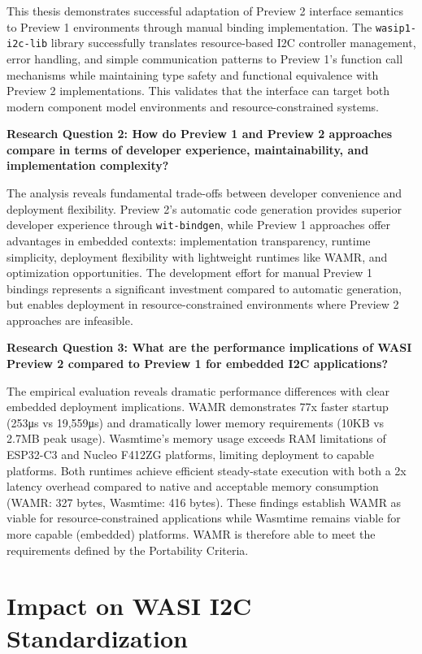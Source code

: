 This thesis demonstrates successful adaptation of Preview 2 interface semantics to Preview 1 environments through manual binding implementation. The \texttt{wasip1-i2c-lib} library successfully translates resource-based I2C controller management, error handling, and simple communication patterns to Preview 1's function call mechanisms while maintaining type safety and functional equivalence with Preview 2 implementations. This validates that the interface can target both modern component model environments and resource-constrained systems.

\textbf{Research Question 2: How do Preview 1 and Preview 2 approaches compare in terms of developer experience, maintainability, and implementation complexity?}

The analysis reveals fundamental trade-offs between developer convenience and deployment flexibility. Preview 2's automatic code generation provides superior developer experience through \texttt{wit-bindgen}, while Preview 1 approaches offer advantages in embedded contexts: implementation transparency, runtime simplicity, deployment flexibility with lightweight runtimes like WAMR, and optimization opportunities. The development effort for manual Preview 1 bindings represents a significant investment compared to automatic generation, but enables deployment in resource-constrained environments where Preview 2 approaches are infeasible.

\textbf{Research Question 3: What are the performance implications of WASI Preview 2 compared to Preview 1 for embedded I2C applications?}

The empirical evaluation reveals dramatic performance differences with clear embedded deployment implications. WAMR demonstrates 77x faster startup (253μs vs 19,559μs) and dramatically lower memory requirements (10KB vs 2.7MB peak usage). Wasmtime's memory usage exceeds RAM limitations of ESP32-C3 and Nucleo F412ZG platforms, limiting deployment to capable platforms. Both runtimes achieve efficient steady-state execution with both a 2x latency overhead compared to native and acceptable memory consumption (WAMR: 327 bytes, Wasmtime: 416 bytes). These findings establish WAMR as viable for resource-constrained applications while Wasmtime remains viable for more capable (embedded) platforms. WAMR is therefore able to meet the requirements defined by the Portability Criteria.

\section*{Impact on WASI I2C Standardization}
\label{sec:standardization-impact}

